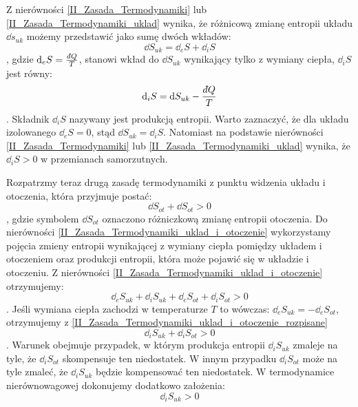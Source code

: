 \documentclass[10pt, a4paper, twoside, onecolumn]{article}
\numberwithin{equation}{section}
\newcommand{\dbar}{d\hspace*{-0.08em}\bar{}\hspace*{0.1em}}
\begin{document}
	Z nierówności \eqref{II_Zasada_Termodynamiki} lub \eqref{II_Zasada_Termodynamiki_uklad} wynika, że różnicową zmianę entropii układu \(\dd{s_{uk}}\) możemy przedstawić jako sumę dwóch wkładów:
	\begin{equation}
		\dd{S_{uk}}=\dd_{e}S+\dd_{i}S
	\end{equation},
	gdzie \(\dd_{e}S=\frac{\dbar Q}{T}\), stanowi wkład do \(\dd{S_{uk}}\) wynikający tylko z wymiany ciepła, \(\dd_{i}S\) jest równy:
	\begin{equation}
		\dd_{i}S=\dd{S_{uk}}-\frac{\dbar Q}{T}
	\end{equation}.
	Składnik \(\dd_{i}S\) nazywany jest produkcją entropii. Warto zaznaczyć, że dla układu izolowanego \(\dd_{e}S=0\), stąd \(\dd{S_{uk}}=\dd_{i}S\). Natomiast na podstawie nierówności \eqref{II_Zasada_Termodynamiki} lub \eqref{II_Zasada_Termodynamiki_uklad} wynika, że \(\dd_{i}S>0\) w przemianach samorzutnych. \par
	Rozpatrzmy teraz drugą zasadę termodynamiki z punktu widzenia układu i otoczenia, która przyjmuje postać:
	\begin{equation}\label{II_Zasada_Termodynamiki_uklad_i_otoczenie}
		\dd{S_{ot}}+\dd{S_{ot}}>0
	\end{equation}, 
	gdzie symbolem \(\dd{S_{ot}}\) oznaczono różniczkową zmianę entropii otoczenia. Do nierówności \eqref{II_Zasada_Termodynamiki_uklad_i_otoczenie} wykorzystamy pojęcia zmieny entropii wynikającej z wymiany ciepła pomiędzy układem i otoczeniem oraz produkcji entropii, która może pojawić się w układzie i otoczeniu. Z nierówności \eqref{II_Zasada_Termodynamiki_uklad_i_otoczenie} otrzymujemy:
	\begin{equation}\label{II_Zasada_Termodynamiki_uklad_i_otoczenie_rozpisane}
		\dd_{e}S_{uk}+\dd_{i}S_{uk}+\dd_{e}S_{ot}+\dd_{i}S_{ot}>0
	\end{equation}.
	Jeśli wymiana ciepła zachodzi w temperaturze \(T\) to wówczas: \(\dd_{e}S_{uk}=-\dd_{e}S_{ot}\), otrzymujemy z \eqref{II_Zasada_Termodynamiki_uklad_i_otoczenie_rozpisane} 
	\begin{equation}\label{}
		\dd_{i}S_{uk}+\dd_{i}S_{ot}>0
	\end{equation}.
	Warunek obejmuje przypadek, w którym produkcja entropii \(\dd_{i}S_{uk}\) zmaleje na tyle, że \(\dd_{i}S_{ot}\) skompensuje ten niedostatek. W innym przypadku \(\dd_{i}S_{ot}\) może na tyle zmaleć, że \(\dd_{i}S_{uk}\) będzie kompensować ten niedostatek. W termodynamice nierównowagowej dokonujemy dodatkowo założenia:
	\begin{equation*}
		\dd_{i}S_{uk}>0
	\end{equation*}
\end{document}
